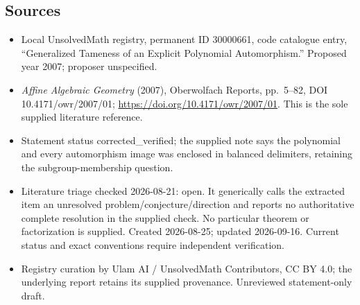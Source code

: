 \documentclass[11pt]{article}
\begin{document}
\subsection{Sources}
\begin{itemize}
\item Local UnsolvedMath registry, permanent ID 30000661, code catalogue entry, ``Generalized Tameness of an Explicit Polynomial Automorphism.'' Proposed year 2007; proposer unspecified.
\item \emph{Affine Algebraic Geometry} (2007), Oberwolfach Reports, pp.\ 5--82, DOI 10.4171/owr/2007/01; \url{https://doi.org/10.4171/owr/2007/01}. This is the sole supplied literature reference.
\item Statement status corrected\_verified; the supplied note says the polynomial and every automorphism image was enclosed in balanced delimiters, retaining the subgroup-membership question.
\item Literature triage checked 2026-08-21: open. It generically calls the extracted item an unresolved problem/conjecture/direction and reports no authoritative complete resolution in the supplied check. No particular theorem or factorization is supplied. Created 2026-08-25; updated 2026-09-16. Current status and exact conventions require independent verification.
\item Registry curation by Ulam AI / UnsolvedMath Contributors, CC BY 4.0; the underlying report retains its supplied provenance. Unreviewed statement-only draft.
\end{itemize}
\end{document}
